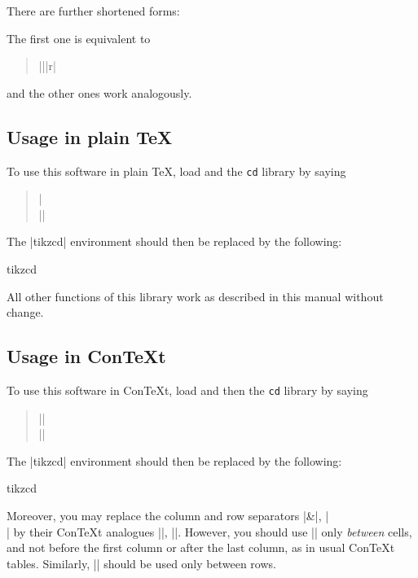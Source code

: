 \documentclass[a4paper]{ltxdoc}
\begin{document}
There are further shortened forms:
\begin{pgfmanualentry}
  \extractcommand\rar{}\@@
  \extractcommand\lar{}\@@
  \extractcommand\dar{}\@@
  \extractcommand\uar{}\@@
  \extractcommand\drar{}\@@
  \extractcommand\urar{}\@@
  \extractcommand\dlar{}\@@
  \extractcommand\ular{}\@@
  \pgfmanualbody
\end{pgfmanualentry}
The first one is equivalent to
\begin{verse}
  |\arrow|{}|{r}|
\end{verse}
and the other ones work analogously.

\subsection{Usage in plain \TeX{}}
\label{sec:usage-plain-tex}

To use this software in plain \TeX{}, load \tikzname{} and the
\texttt{cd} library by saying
\begin{verse}
  |\\
  |\usetikzlibrary{cd}|
\end{verse}
The |{tikzcd}| environment should then be replaced by the following:
\begin{plainenvironment}{{tikzcd}}
\end{plainenvironment}
All other functions of this library work as described in this manual
without change.

\subsection{Usage in Con\TeX t}
\label{sec:usage-plain-context}

To use this software in Con\TeX t, load \tikzname{} and then the
\texttt{cd} library by saying
\begin{verse}
  |\usemodule[tikz]|\\
  |\usetikzlibrary[cd]|
\end{verse}
The |{tikzcd}| environment should then be replaced by the following:
\begin{contextenvironment}{{tikzcd}}
\end{contextenvironment}
Moreover, you may replace the column and row separators |&|, |\\| by
their Con\TeX t analogues |\NC|, |\NR|.  However, you should use |\NC|
only \emph{between} cells, and not before the first column or after
the last column, as in usual Con\TeX t tables.  Similarly, |\NR|
should be used only between rows.
\end{document}
